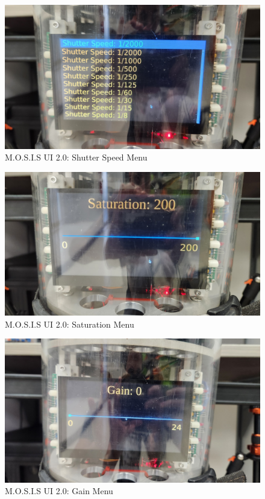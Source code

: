 \begin{figure}[H]
  \begin{center}
  \includegraphics[width=\textwidth]{../Appendix/Design_Documentation/System_Snapshots/Figures/Shutter_Speed_Select.jpeg}
  \end{center}
  \caption{M.O.S.I.S UI 2.0: Shutter Speed Menu}
\end{figure}
\begin{figure}[H]
  \begin{center}
  \includegraphics[width=\textwidth]{../Appendix/Design_Documentation/System_Snapshots/Figures/Saturation_Select.jpeg}
  \end{center}
  \caption{M.O.S.I.S UI 2.0: Saturation Menu}
\end{figure}
\begin{figure}[H]
  \begin{center}
  \includegraphics[width=\textwidth]{../Appendix/Design_Documentation/System_Snapshots/Figures/Gain_Select.jpeg}
  \end{center}
  \caption{M.O.S.I.S UI 2.0: Gain Menu}
\end{figure}
